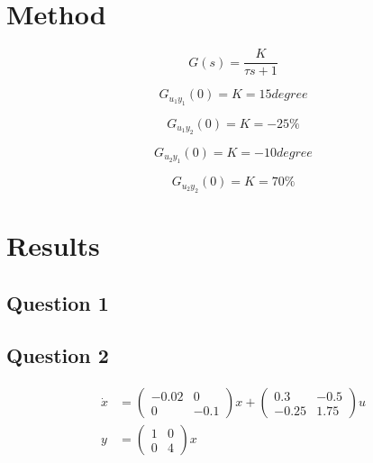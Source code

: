 \documentclass[a4paper, titlepage]{article}
\begin{document}
\section{Method}


\begin{equation}
G(s) = \frac{K}{\tau s + 1}
\end{equation}

\begin{equation}
G_{u_1y_1}(0) = K = 15degree
\end{equation}

\begin{equation}
G_{u_1y_2}(0) = K = -25\% 
\end{equation}

\begin{equation}
G_{u_2y_1}(0) = K = -10degree 
\end{equation}

\begin{equation}
G_{u_2y_2}(0) = K = 70\% 
\end{equation}

\section{Results}

\subsection{Question 1}

\subsection{Question 2}

\begin{equation}
\begin{split}
\dot{x} &= 
\begin{pmatrix}
-0.02 & 0 \\ 0 & -0.1
\end{pmatrix}x
+
\begin{pmatrix}
0.3 & -0.5 \\ -0.25 & 1.75
\end{pmatrix}u \\
y &= 
\begin{pmatrix}
1 & 0 \\ 0 & 4
\end{pmatrix}x
\end{split}
\end{equation}
\end{document}
